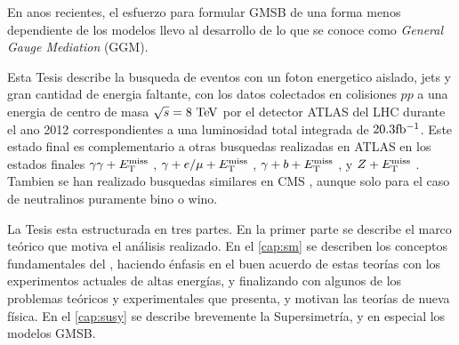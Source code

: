 En anos recientes, el esfuerzo para formular GMSB de una forma menos dependiente de
los modelos llevo al desarrollo de lo que se conoce como \emph{General Gauge Mediation} (GGM).


Esta Tesis describe la busqueda de eventos con un foton energetico aislado, jets
y gran cantidad de energia faltante, con los datos colectados en colisiones $pp$
a una energia de centro de masa $\sqrt{s} = 8 \tev$ por el detector
ATLAS del LHC durante el ano 2012 correspondientes a una luminosidad total
integrada de $20.3 \mbox{fb$^{-1}$}$. Este estado final es complementario a otras busquedas
realizadas en ATLAS en los estados finales $\gamma\gamma+E_{\mathrm{T}}^{\mathrm{miss}}$ \cite{Aad2012519,ATLAS-CONF-2014-001},
$\gamma+e/\mu+E_{\mathrm{T}}^{\mathrm{miss}}$ \cite{ATLAS-CONF-2012-144}, $\gamma+b+E_{\mathrm{T}}^{\mathrm{miss}}$
\cite{Aad:2012jva}, y $Z+E_{\mathrm{T}}^{\mathrm{miss}}$ \cite{ATLAS-CONF-2012-152}.
Tambien se han realizado busquedas similares en CMS \cite{CMS-PAS-SUS-12-018,CMS-PAS-SUS-14-004},
aunque solo para el caso de neutralinos puramente bino o wino.


La Tesis esta estructurada en tres partes. En la primer parte se describe el
marco teórico que motiva el análisis realizado. En el \cref{cap:sm} se describen
los conceptos fundamentales del {\SM}, haciendo énfasis en el buen acuerdo de
estas teorías con los experimentos actuales de altas energías, y finalizando con
algunos de los problemas teóricos y experimentales que presenta, y motivan las
teorías de nueva física. En el \cref{cap:susy} se describe brevemente la
Supersimetría, y en especial los modelos GMSB.

